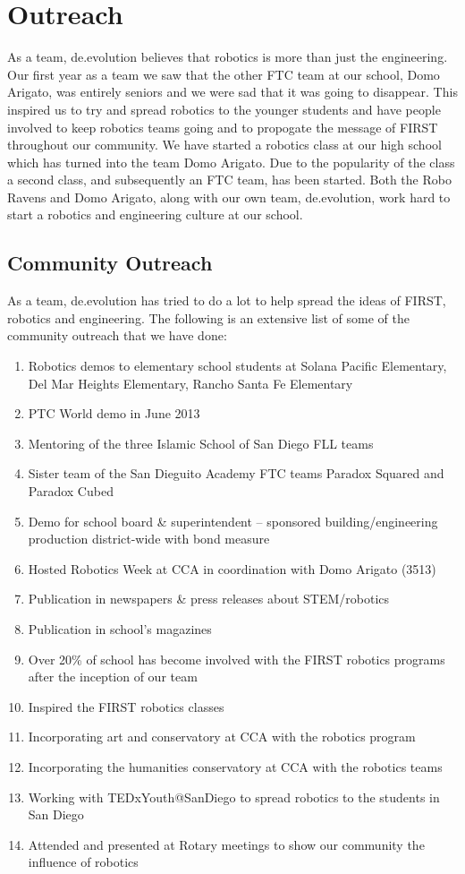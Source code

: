 \section{Outreach}

As a team, de.evolution believes that robotics is more than just the engineering. Our first year as a team we saw that the other FTC team at our school, Domo Arigato, was entirely seniors and we were sad that it was going to disappear. This inspired us to try and spread robotics to the younger students and have people involved to keep robotics teams going and to propogate the message of FIRST throughout our community. We have started a robotics class at our high school which has turned into the team Domo Arigato. Due to the popularity of the class a second class, and subsequently an FTC team, has been started. Both the Robo Ravens and Domo Arigato, along with our own team, de.evolution, work hard to start a robotics and engineering culture at our school.

\subsection{Community Outreach}
As a team, de.evolution has tried to do a lot to help spread the ideas of FIRST, robotics and engineering. The following is an extensive list of some of the community outreach that we have done:

\begin{enumerate}
	\item Robotics demos to elementary school students at Solana Pacific Elementary, Del Mar Heights Elementary, Rancho Santa Fe Elementary
	\item PTC World demo in June 2013
	\item Mentoring of the three Islamic School of San Diego FLL teams 
	\item Sister team of the San Dieguito Academy FTC teams Paradox Squared and Paradox Cubed
	\item Demo for school board \& superintendent – sponsored building/engineering production district-wide with bond measure
	\item Hosted Robotics Week at CCA in coordination with Domo Arigato (3513)
	\item Publication in newspapers \& press releases about STEM/robotics
	\item Publication in school's magazines
	\item Over 20\% of school has become involved with the FIRST robotics programs after the inception of our team
	\item Inspired the FIRST robotics classes
	\item Incorporating art and conservatory at CCA with the robotics program
	\item Incorporating the humanities conservatory at CCA with the robotics teams
	\item Working with TEDxYouth@SanDiego to spread robotics to the students in San Diego
	\item Attended and presented at Rotary meetings to show our community the influence of robotics
\end{enumerate}

